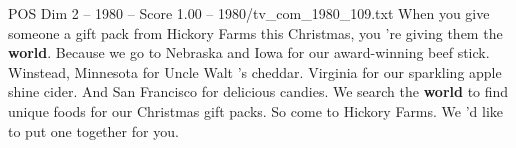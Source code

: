 \begin{textsample}{POS Dim 2 – 1980 – Score 1.00 – 1980/tv\_com\_1980\_109.txt}  \label{ex:f2_pos_068}
When you give someone a gift pack from Hickory Farms this Christmas, you 're giving them the \textbf{world}.
Because we go to Nebraska and Iowa for our award-winning beef stick.
Winstead, Minnesota for Uncle Walt 's cheddar.
Virginia for our sparkling apple shine cider.
And San Francisco for delicious candies.
We search the \textbf{world} to find unique foods for our Christmas gift packs.
So come to Hickory Farms.
We 'd like to put one together for you.

\end{textsample}

